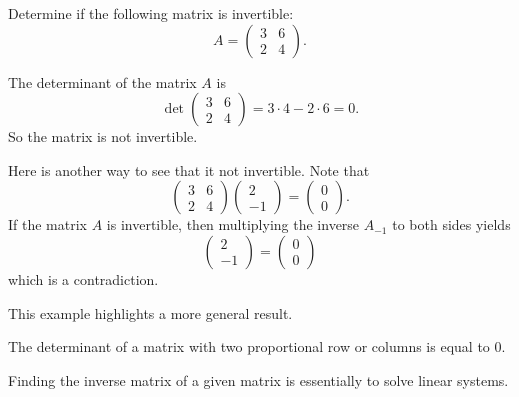 \begin{example}
  Determine if the following matrix is invertible:
  \[
    A=
  \begin{pmatrix}
    3 & 6 \\
    2 & 4
  \end{pmatrix}.  
  \]
\end{example}
\begin{solution}
  The determinant of the matrix $A$ is
  \[
    \det\begin{pmatrix}
      3 & 6 \\
      2 & 4
    \end{pmatrix}=3\cdot 4-2\cdot 6=0.
  \]
  So the matrix is not invertible.

  Here is another way to see that it not invertible. Note that
\[\begin{pmatrix}
  3 & 6 \\
  2 & 4
\end{pmatrix}\begin{pmatrix}
  2\\ -1
\end{pmatrix}=\begin{pmatrix}
  0\\0
\end{pmatrix}.\]
If the matrix $A$ is invertible, then multiplying the inverse $A_{-1}$ to both sides yields
\[\begin{pmatrix}
  2\\ -1
\end{pmatrix}=\begin{pmatrix}
  0\\0
\end{pmatrix}\]
which is a contradiction.
\end{solution}

This example highlights a more general result.
\begin{theorem}
The determinant of a matrix with two proportional row or columns is equal to $0$.
\end{theorem}

Finding the inverse matrix of a given matrix is essentially to solve linear systems.

